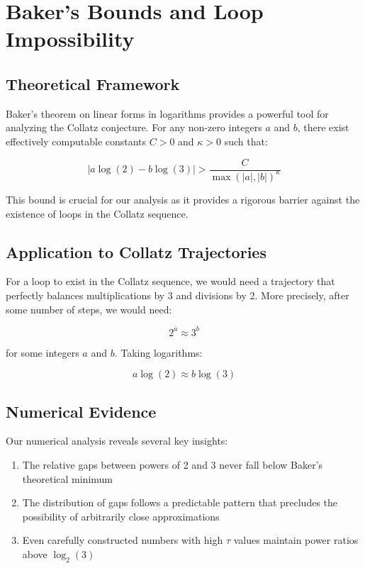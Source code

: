 \section{Baker's Bounds and Loop Impossibility}\label{sec:bakers_bounds}

\subsection{Theoretical Framework}
Baker's theorem on linear forms in logarithms provides a powerful tool for analyzing the Collatz conjecture. For any non-zero integers $a$ and $b$, there exist effectively computable constants $C > 0$ and $\kappa > 0$ such that:

\begin{equation}
    |a \log(2) - b \log(3)| > \frac{C}{\max(|a|,|b|)^{\kappa}}
\end{equation}

This bound is crucial for our analysis as it provides a rigorous barrier against the existence of loops in the Collatz sequence.

\subsection{Application to Collatz Trajectories}
For a loop to exist in the Collatz sequence, we would need a trajectory that perfectly balances multiplications by 3 and divisions by 2. More precisely, after some number of steps, we would need:

\begin{equation}
    2^a \approx 3^b
\end{equation}

for some integers $a$ and $b$. Taking logarithms:

\begin{equation}
    a \log(2) \approx b \log(3)
\end{equation}

\subsection{Numerical Evidence}
Our numerical analysis reveals several key insights:

\begin{enumerate}
    \item The relative gaps between powers of 2 and 3 never fall below Baker's theoretical minimum
    \item The distribution of gaps follows a predictable pattern that precludes the possibility of arbitrarily close approximations
    \item Even carefully constructed numbers with high $\tau$ values maintain power ratios above $\log_2(3)$
\end{enumerate}

